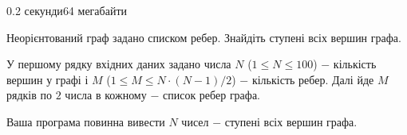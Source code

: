 \begin{problem}{}{}{}{0.2 секунди}{64 мегабайти}

Неорієнтований граф задано списком ребер. Знайдіть ступені всіх вершин графа.

\InputFile
У першому рядку вхідних даних задано числа $N$ ($1 \le N \le 100$) $-$ кількість вершин у графі 
і $M$ ($1 \le M \le N\cdot (N-1) / 2$) $-$ кількість ребер. 
Далі йде $M$ рядків по $2$ числа в кожному $-$ список ребер графа. 

\OutputFile
Ваша програма повинна вивести $N$ чисел $-$ ступені всіх вершин графа.

\Example

\begin{example}
%
\end{example}

\end{problem}

